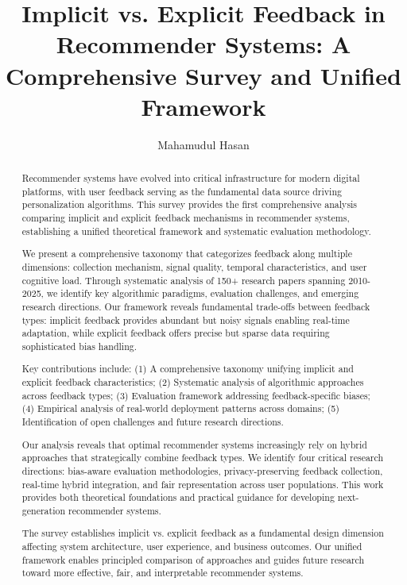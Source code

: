 \documentclass[acmsmall,screen]{acmart}
\title{Implicit vs. Explicit Feedback in Recommender Systems: A Comprehensive Survey and Unified Framework}
\author{Mahamudul Hasan}
\affiliation{%
  \institution{University of Minnesota Twin Cities}
  \city{Minneapolis}
  \state{Minnesota}
  \country{USA}}
\begin{document}
\begin{abstract}
Recommender systems have evolved into critical infrastructure for modern digital platforms, with user feedback serving as the fundamental data source driving personalization algorithms. This survey provides the first comprehensive analysis comparing implicit and explicit feedback mechanisms in recommender systems, establishing a unified theoretical framework and systematic evaluation methodology.

We present a comprehensive taxonomy that categorizes feedback along multiple dimensions: collection mechanism, signal quality, temporal characteristics, and user cognitive load. Through systematic analysis of 150+ research papers spanning 2010-2025, we identify key algorithmic paradigms, evaluation challenges, and emerging research directions. Our framework reveals fundamental trade-offs between feedback types: implicit feedback provides abundant but noisy signals enabling real-time adaptation, while explicit feedback offers precise but sparse data requiring sophisticated bias handling.

Key contributions include: (1) A comprehensive taxonomy unifying implicit and explicit feedback characteristics; (2) Systematic analysis of algorithmic approaches across feedback types; (3) Evaluation framework addressing feedback-specific biases; (4) Empirical analysis of real-world deployment patterns across domains; (5) Identification of open challenges and future research directions.

Our analysis reveals that optimal recommender systems increasingly rely on hybrid approaches that strategically combine feedback types. We identify four critical research directions: bias-aware evaluation methodologies, privacy-preserving feedback collection, real-time hybrid integration, and fair representation across user populations. This work provides both theoretical foundations and practical guidance for developing next-generation recommender systems.

The survey establishes implicit vs. explicit feedback as a fundamental design dimension affecting system architecture, user experience, and business outcomes. Our unified framework enables principled comparison of approaches and guides future research toward more effective, fair, and interpretable recommender systems.
\end{abstract}

\maketitle












\end{document}
